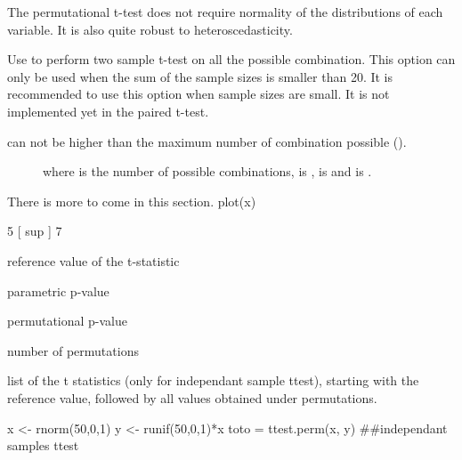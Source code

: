 \documentclass[a4paper]{book}
\begin{document}
%
\begin{Details}\relax
The permutational t-test does not require normality of the distributions of each variable.
It is also quite robust to heteroscedasticity.

Use  to perform two sample t-test on all the possible combination.
This option can only be used when the sum of the sample sizes  is smaller than 20.
It is recommended to use this option when sample sizes are small.
It is not implemented yet in the paired t-test.

 can not be higher than the maximum number of combination possible ().

\begin{description}

\item[] 


where  is the number of possible combinations, 
is ,  is
 and  is
.
\end{description}


There is more to come in this section. plot(x)

5 [ sup ] 7



\end{Details}
%
\begin{Value}
\begin{ldescription}
\item[\code{t.ref }] reference value of the t-statistic
\item[\code{p.param }] parametric p-value
\item[\code{p.perm }] permutational p-value
\item[\code{nperm }] number of permutations
\item[\code{perm.t }] list of the t statistics (only for independant sample ttest), starting with the reference value, followed by all values obtained under permutations.
\end{ldescription}
\end{Value}
%
\begin{Examples}
\begin{ExampleCode}
x <- rnorm(50,0,1)
y <- runif(50,0,1)*x
toto = ttest.perm(x, y)  ##independant samples ttest
\end{ExampleCode}
\end{Examples}
\end{document}
